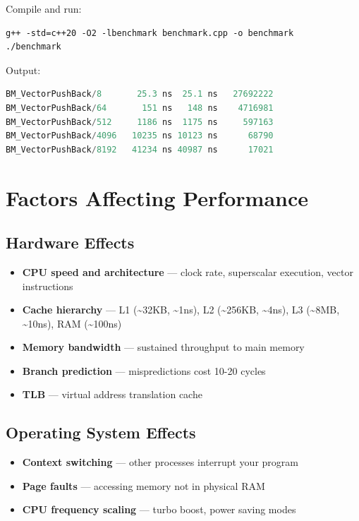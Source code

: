 Compile and run:

\begin{lstlisting}
g++ -std=c++20 -O2 -lbenchmark benchmark.cpp -o benchmark
./benchmark
\end{lstlisting}

Output:

\begin{lstlisting}[language=Java]
BM_VectorPushBack/8       25.3 ns  25.1 ns   27692222
BM_VectorPushBack/64       151 ns   148 ns    4716981
BM_VectorPushBack/512     1186 ns  1175 ns     597163
BM_VectorPushBack/4096   10235 ns 10123 ns      68790
BM_VectorPushBack/8192   41234 ns 40987 ns      17021
\end{lstlisting}

\section{Factors Affecting Performance}

\subsection{Hardware Effects}

\begin{itemize}
\item \textbf{CPU speed and architecture} — clock rate, superscalar execution, vector instructions
\item \textbf{Cache hierarchy} — L1 (\textasciitilde{}32KB, \textasciitilde{}1ns), L2 (\textasciitilde{}256KB, \textasciitilde{}4ns), L3 (\textasciitilde{}8MB, \textasciitilde{}10ns), RAM (\textasciitilde{}100ns)
\item \textbf{Memory bandwidth} — sustained throughput to main memory
\item \textbf{Branch prediction} — mispredictions cost 10-20 cycles
\item \textbf{TLB} — virtual address translation cache
\end{itemize}

\subsection{Operating System Effects}

\begin{itemize}
\item \textbf{Context switching} — other processes interrupt your program
\item \textbf{Page faults} — accessing memory not in physical RAM
\item \textbf{CPU frequency scaling} — turbo boost, power saving modes
\end{itemize}

